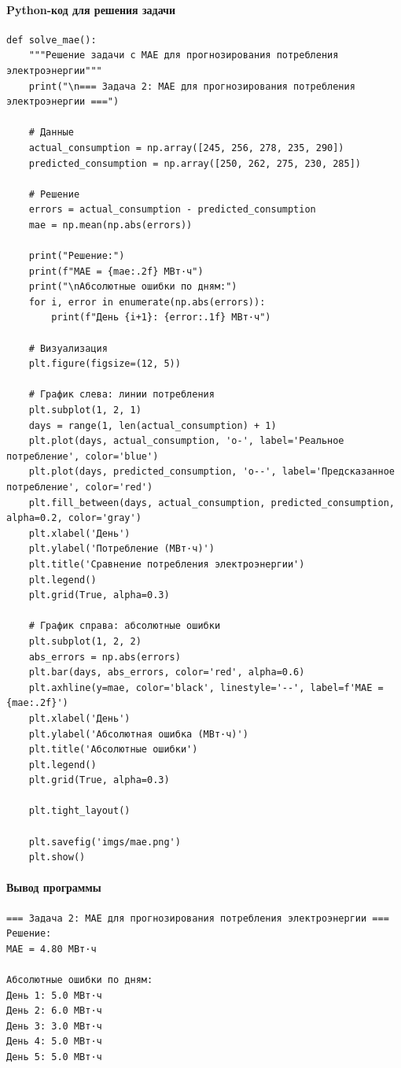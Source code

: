 \documentclass[12pt]{article}
\theoremstyle{definition}
\theoremstyle{definition}
\theoremstyle{definition}
\theoremstyle{remark}
\theoremstyle{remark}
\begin{document}
\paragraph*{Python-код для решения задачи}

\begin{verbatim}
def solve_mae():
    """Решение задачи с MAE для прогнозирования потребления электроэнергии"""
    print("\n=== Задача 2: MAE для прогнозирования потребления электроэнергии ===")
    
    # Данные
    actual_consumption = np.array([245, 256, 278, 235, 290])
    predicted_consumption = np.array([250, 262, 275, 230, 285])
    
    # Решение
    errors = actual_consumption - predicted_consumption
    mae = np.mean(np.abs(errors))
    
    print("Решение:")
    print(f"MAE = {mae:.2f} МВт·ч")
    print("\nАбсолютные ошибки по дням:")
    for i, error in enumerate(np.abs(errors)):
        print(f"День {i+1}: {error:.1f} МВт·ч")
    
    # Визуализация
    plt.figure(figsize=(12, 5))
    
    # График слева: линии потребления
    plt.subplot(1, 2, 1)
    days = range(1, len(actual_consumption) + 1)
    plt.plot(days, actual_consumption, 'o-', label='Реальное потребление', color='blue')
    plt.plot(days, predicted_consumption, 'o--', label='Предсказанное потребление', color='red')
    plt.fill_between(days, actual_consumption, predicted_consumption, alpha=0.2, color='gray')
    plt.xlabel('День')
    plt.ylabel('Потребление (МВт·ч)')
    plt.title('Сравнение потребления электроэнергии')
    plt.legend()
    plt.grid(True, alpha=0.3)
    
    # График справа: абсолютные ошибки
    plt.subplot(1, 2, 2)
    abs_errors = np.abs(errors)
    plt.bar(days, abs_errors, color='red', alpha=0.6)
    plt.axhline(y=mae, color='black', linestyle='--', label=f'MAE = {mae:.2f}')
    plt.xlabel('День')
    plt.ylabel('Абсолютная ошибка (МВт·ч)')
    plt.title('Абсолютные ошибки')
    plt.legend()
    plt.grid(True, alpha=0.3)
    
    plt.tight_layout()
    
    plt.savefig('imgs/mae.png')
    plt.show()
\end{verbatim}
\paragraph{Вывод программы}
\begin{verbatim}
=== Задача 2: MAE для прогнозирования потребления электроэнергии ===
Решение:
MAE = 4.80 МВт·ч

Абсолютные ошибки по дням:
День 1: 5.0 МВт·ч
День 2: 6.0 МВт·ч
День 3: 3.0 МВт·ч
День 4: 5.0 МВт·ч
День 5: 5.0 МВт·ч
\end{verbatim}
\end{document}
